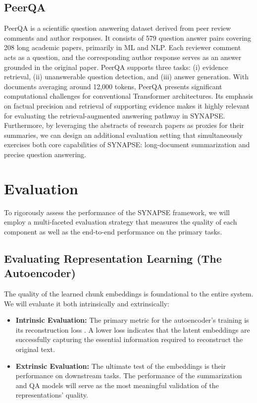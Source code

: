 \documentclass[11pt]{article}
\begin{document}
\subsection{PeerQA}
PeerQA \citep{baumgärtner2025peerqascientificquestionanswering} is a scientific question answering dataset derived from peer review comments and author responses. It consists of 579 question answer pairs covering 208 long academic papers, primarily in ML and NLP. Each reviewer comment acts as a question, and the corresponding author response serves as an answer grounded in the original paper. PeerQA supports three tasks: (i) evidence retrieval, (ii) unanswerable question detection, and (iii) answer generation. With documents averaging around 12,000 tokens, PeerQA presents significant computational challenges for conventional Transformer architectures. Its emphasis on factual precision and retrieval of supporting evidence makes it highly relevant for evaluating the retrieval-augmented answering pathway in SYNAPSE. Furthermore, by leveraging the abstracts of research papers as proxies for their summaries, we can design an additional evaluation setting that simultaneously exercises both core capabilities of SYNAPSE: long-document summarization and precise question answering.

\section{Evaluation}
To rigorously assess the performance of the SYNAPSE framework, we will employ a multi-faceted evaluation strategy that measures the quality of each component as well as the end-to-end performance on the primary tasks.

\subsection{Evaluating Representation Learning (The Autoencoder)}
The quality of the learned chunk embeddings is foundational to the entire system. We will evaluate it both intrinsically and extrinsically:
\begin{itemize}
    \item \textbf{Intrinsic Evaluation:} The primary metric for the autoencoder's training is its reconstruction loss \citep{michelucci2022introductionautoencoders}. A lower loss indicates that the latent embeddings are successfully capturing the essential information required to reconstruct the original text.
    \item \textbf{Extrinsic Evaluation:} The ultimate test of the embeddings is their performance on downstream tasks. The performance of the summarization and QA models will serve as the most meaningful validation of the representations' quality.
\end{itemize}
\end{document}
